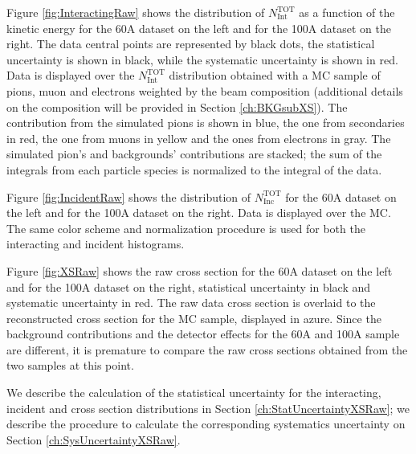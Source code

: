 Figure \ref{fig:InteractingRaw} shows the distribution of  $N^{\text{TOT}}_{\text{Int}}$  as a function of the kinetic energy for the 60A dataset on the left and for the 100A dataset on the right. The data central points are represented by black dots, the statistical uncertainty is shown in black, while the systematic uncertainty is shown in red. Data is displayed over the $N^{\text{TOT}}_{\text{Int}}$  distribution obtained with a MC sample of pions, muon and electrons weighted by the beam composition (additional details on the composition will be provided in Section \ref{ch:BKGsubXS}). The contribution from the simulated pions is shown in blue, the one from secondaries in red, the one from muons in yellow and the ones from electrons in gray. 
The simulated pion's and backgrounds' contributions are stacked; the sum of the integrals from each particle species is normalized to the integral of the data.
 
Figure \ref{fig:IncidentRaw} shows the distribution of  $N^{\text{TOT}}_{\text{Inc}}$   for the 60A dataset on the left and for the 100A dataset on the right. Data is displayed over the MC. The same color scheme and normalization procedure is used for both the interacting and incident histograms. 


Figure \ref{fig:XSRaw} shows the raw cross section for the 60A dataset on the left and for the 100A dataset on the right, statistical uncertainty in black and systematic uncertainty in red. The raw data cross section is overlaid to the reconstructed cross section for the MC sample, displayed in azure. Since the background contributions and the detector effects for the 60A and 100A sample are different, it is premature to compare the raw cross sections obtained from the two samples at this point.

We describe the calculation of the statistical uncertainty for the interacting, incident and cross section distributions in Section \ref{ch:StatUncertaintyXSRaw}; we describe the procedure to calculate the corresponding systematics uncertainty on Section \ref{ch:SysUncertaintyXSRaw}.

